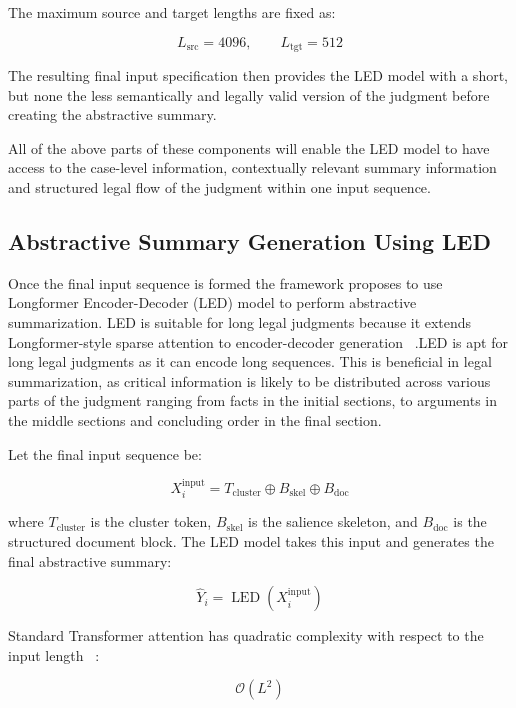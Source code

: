 \documentclass[11pt, a4paper]{article}
\theoremstyle{plain}%
\theoremstyle{remark}%
\theoremstyle{definition}%
\begin{document}
The maximum source and target lengths are fixed as:

\begin{equation}
L_{\text{src}} = 4096, \qquad L_{\text{tgt}} = 512
\end{equation}

The resulting final input specification then provides the LED model with a short, but none the less semantically and legally valid version of the judgment before creating the abstractive summary.


All of the above parts of these components will enable the LED model to have access to the case-level information, contextually relevant summary information and structured legal flow of the judgment within one input sequence.

\subsection{Abstractive Summary Generation Using LED}
Once the final input sequence is formed the framework proposes to use Longformer Encoder-Decoder (LED) model to perform abstractive summarization. LED is suitable for long legal judgments because it extends Longformer-style sparse attention to encoder-decoder generation ~\cite{b21}.LED is apt for long legal judgments as it can encode long sequences. This is beneficial in legal summarization, as critical information is likely to be distributed across various parts of the judgment ranging from facts in the initial sections, to arguments in the middle sections and concluding order in the final section.

Let the final input sequence be:

\begin{equation}
X_i^{\text{input}} =
T_{\text{cluster}} \oplus B_{\text{skel}} \oplus B_{\text{doc}}
\end{equation}

where $T_{\text{cluster}}$ is the cluster token, $B_{\text{skel}}$ is the salience skeleton, and $B_{\text{doc}}$ is the structured document block. The LED model takes this input and generates the final abstractive summary:

\begin{equation}
\hat{Y}_i = \operatorname{LED}\left(X_i^{\text{input}}\right)
\end{equation}

Standard Transformer attention has quadratic complexity with respect to the input length ~\cite{b19}:

\begin{equation}
\mathcal{O}(L^2)
\end{equation}
\end{document}
